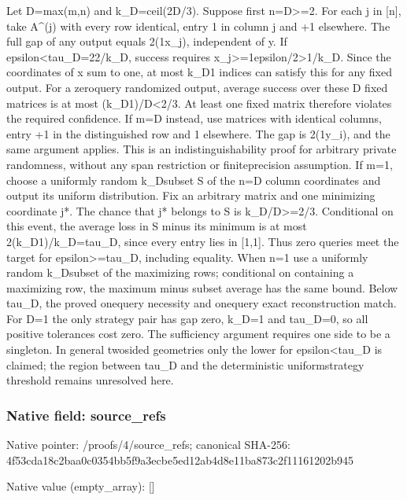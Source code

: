 \documentclass[10pt,a4paper]{article}
\begin{document}
Let D=max(m,n) and k\_D=ceil(2D/3). Suppose first n=D>=2. For each j in [n], take A\textasciicircum{}(j) with every row identical, entry 1 in column j and +1 elsewhere. The full gap of any output equals 2(1x\_j), independent of y. If epsilon<tau\_D=22/k\_D, success requires x\_j>=1epsilon/2>1/k\_D. Since the coordinates of x sum to one, at most k\_D1 indices can satisfy this for any fixed output. For a zeroquery randomized output, average success over these D fixed matrices is at most (k\_D1)/D<2/3. At least one fixed matrix therefore violates the required confidence. If m=D instead, use matrices with identical columns, entry +1 in the distinguished row and 1 elsewhere. The gap is 2(1y\_i), and the same argument applies. This is an indistinguishability proof for arbitrary private randomness, without any span restriction or finiteprecision assumption.
If m=1, choose a uniformly random k\_Dsubset S of the n=D column coordinates and output its uniform distribution. Fix an arbitrary matrix and one minimizing coordinate j*. The chance that j* belongs to S is k\_D/D>=2/3. Conditional on this event, the average loss in S minus its minimum is at most 2(k\_D1)/k\_D=tau\_D, since every entry lies in [1,1]. Thus zero queries meet the target for epsilon>=tau\_D, including equality. When n=1 use a uniformly random k\_Dsubset of the maximizing rows; conditional on containing a maximizing row, the maximum minus subset average has the same bound. Below tau\_D, the proved onequery necessity and onequery exact reconstruction match. For D=1 the only strategy pair has gap zero, k\_D=1 and tau\_D=0, so all positive tolerances cost zero. The sufficiency argument requires one side to be a singleton. In general twosided geometries only the lower for epsilon<tau\_D is claimed; the region between tau\_D and the deterministic uniformstrategy threshold remains unresolved here.


\subsubsection{Native field: source\_refs}


Native pointer: /proofs/4/source\_refs; canonical SHA-256: 4f53cda18c2baa0c0354bb5f\allowbreak{}9a3ecbe5ed12ab4d8e11ba87\allowbreak{}3c2f11161202b945



Native value (empty\_array): []
\end{document}
